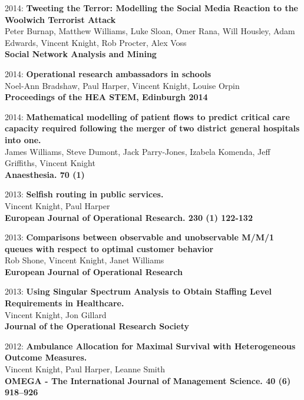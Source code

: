 \documentclass[10pt]{res} %
\begin{document}
\begin{resume}
\begin{etaremune}
\item
2014: \textbf{Tweeting the Terror: Modelling the Social Media Reaction to the Woolwich Terrorist Attack}\\
Peter Burnap, Matthew Williams, Luke Sloan, Omer Rana, Will Housley, Adam Edwards, Vincent Knight, Rob Procter, Alex Voss
\\
\textbf{Social Network Analysis and Mining}
\\

\item
2014: \textbf{Operational research ambassadors in schools}\\
Noel-Ann Bradshaw, Paul Harper, Vincent Knight, Louise Orpin
\\
\textbf{Proceedings of the HEA STEM, Edinburgh 2014}
\\

\item
2014: \textbf{Mathematical modelling of patient flows to predict critical care capacity required following the merger of two district general hospitals into one.}\\
James Williams, Steve Dumont, Jack Parry-Jones, Izabela Komenda, Jeff Griffiths, Vincent Knight
\\
\textbf{Anaesthesia. 70 (1)}
\\

\item
2013: \textbf{Selfish routing in public services.}\\
Vincent Knight, Paul Harper
\\
\textbf{European Journal of Operational Research. 230 (1) 122-132}
\\

\item
2013: \textbf{Comparisons between observable and unobservable M/M/1 queues with respect to optimal customer behavior}\\
Rob Shone, Vincent Knight, Janet Williams
\\
\textbf{European Journal of Operational Research}
\\

\item
2013: \textbf{Using Singular Spectrum Analysis to Obtain Staffing Level Requirements in Healthcare.}\\
Vincent Knight, Jon Gillard
\\
\textbf{Journal of the Operational Research Society}
\\

\item
2012: \textbf{Ambulance Allocation for Maximal Survival with Heterogeneous Outcome Measures.}\\
Vincent Knight, Paul Harper, Leanne Smith
\\
\textbf{OMEGA - The International Journal of Management Science. 40 (6) 918--926}
\\


\end{etaremune}
\end{resume}
\end{document}
